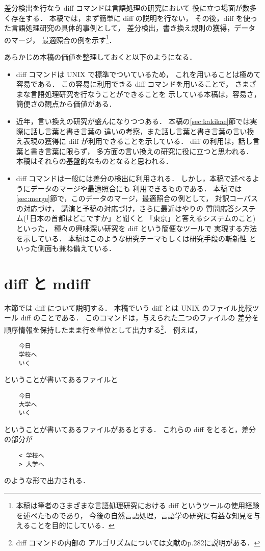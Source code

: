 差分検出を行なう diff コマンドは言語処理の研究において
役に立つ場面が数多く存在する．
本稿では，まず簡単に diff の説明を行ない，
その後，diff を使った言語処理研究の具体的事例として，
差分検出，書き換え規則の獲得，データのマージ，
最適照合の例を示す\footnote{本稿は筆者のさまざまな言語処理研究における
diff というツールの使用経験を述べたものであり，
今後の自然言語処理，言語学の研究に有益な知見を与えることを目的にしている．}．

あらかじめ本稿の価値を整理しておくと以下のようになる．
\begin{itemize}
\item 
  diff コマンドは UNIX で標準でついているため，
  これを用いることは極めて容易である．
  この容易に利用できる diff コマンドを用いることで，
  さまざまな言語処理研究を行なうことができることを
  示している本稿は，容易さ，簡便さの観点から価値がある．

\item 
  近年，言い換えの研究が盛んになりつつある\cite{iikae_jws}．
  本稿の\ref{sec:kakikae}節では実際に話し言葉と書き言葉の
  違いの考察，また話し言葉と書き言葉の言い換え表現の獲得\cite{murata_kaiho_2001}に
  diff が利用できることを示している．
  diff の利用は，話し言葉と書き言葉に限らず，
  多方面の言い換えの研究に役に立つと思われる．
  本稿はそれらの基盤的なものとなると思われる．

\item 
  diff コマンドは一般には差分の検出に利用される．
  しかし，本稿で述べるようにデータのマージや最適照合にも
  利用できるものである．
  本稿では\ref{sec:merge}節で，このデータのマージ，最適照合の例として，
  対訳コーパスの対応づけ，
  講演と予稿の対応づけ，さらに最近はやりの
  質問応答システム(「日本の首都はどこですか」と聞くと
  「東京」と答えるシステムのこと)といった，
  種々の興味深い研究を diff という簡便なツールで
  実現する方法を示している．
  本稿はこのような研究テーマもしくは研究手段の斬新性
  といった側面も兼ね備えている．

\end{itemize}


\section{diff と mdiff}
\label{sec:diff_and_mdiff}

本節では diff について説明する．
本稿でいう diff とは
UNIX のファイル比較ツール diff のことである．
このコマンドは，与えられた二つのファイルの
差分を順序情報を保持したまま行を単位として出力する\footnote{diff コマンドの内部の
アルゴリズムについては文献\cite{algo}のp.282に説明がある．}．
例えば，
\begin{verbatim}
    今日
    学校へ
    いく
\end{verbatim}
ということが書いてあるファイルと
\begin{verbatim}
    今日
    大学へ
    いく
\end{verbatim}
ということが書いてあるファイルがあるとする．
これらの diff をとると，差分の部分が
\begin{verbatim}
    < 学校へ
    > 大学へ
\end{verbatim}
のような形で出力される．

